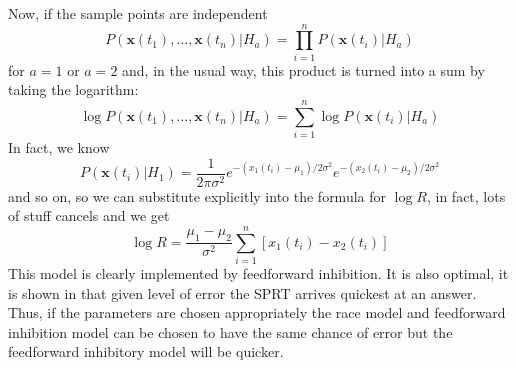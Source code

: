 \documentclass[11pt,a4paper]{scrartcl}
\begin{document}
Now, if the sample points are independent
\begin{equation}
P(\textbf{x}(t_1),\ldots,\textbf{x}(t_n)|H_a)=\prod_{i=1}^nP(\textbf{x}(t_i)|H_a)
\end{equation}
for $a=1$ or $a=2$ and, in the usual way, this product is turned into a sum by taking the logarithm:
\begin{equation}
\log{P(\textbf{x}(t_1),\ldots,\textbf{x}(t_n)|H_a)}=\sum_{i=1}^n\log{P(\textbf{x}(t_i)|H_a)}
\end{equation}
In fact, we know 
\begin{equation}
P(\textbf{x}(t_i)|H_1)=\frac{1}{2\pi\sigma^2}e^{-(x_1(t_i)-\mu_1)/2\sigma^2}e^{-(x_2(t_i)-\mu_2)/2\sigma^2}
\end{equation}
and so on, so we can substitute explicitly into the formula for $\log{R}$, in fact, lots of stuff cancels and we get
\begin{equation}
\log{R}=\frac{\mu_1-\mu_2}{\sigma^2}\sum_{i=1}^n[x_1(t_i)-x_2(t_i)]
\end{equation}
This model is clearly implemented by feedforward inhibition. It is
also optimal, it is shown in \cite{WaldWolfowitz1948a} that given
level of error the SPRT arrives quickest at an answer. Thus, if the
parameters are chosen appropriately the race model and feedforward
inhibition model can be chosen to have the same chance of error but
the feedforward inhibitory model will be quicker.
 
\end{document}
